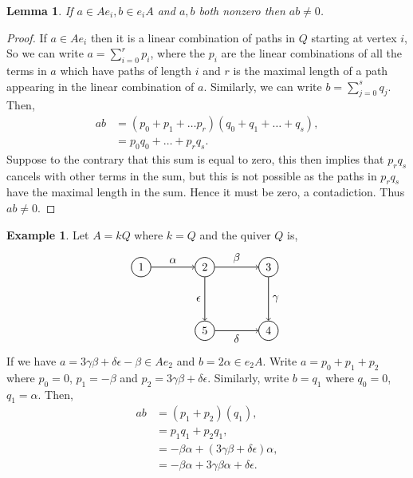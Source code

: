 \documentclass[11.5pt, twoside, a4paper, titlepage]{report}
\theoremstyle{definition}
\newtheorem{eg}[mydef]{Example}
\theoremstyle{plain}
\newtheorem{lem}[mydef]{Lemma}
\begin{document}
\begin{lem} \label{idempotent0lem}
If $a \in Ae_i, b\in e_iA$ and $a,b$ both nonzero then $ab\neq 0$.
\end{lem}
\begin{proof}
If $a\in Ae_i$ then it is a linear combination of paths in $Q$ starting at vertex $i$, So we can write $a= \sum^r_{i=0}p_i$, where the $p_i$ are the linear combinations of all the terms in $a$ which have paths of length $i$ and $r$ is the maximal length of a path appearing in the linear combination of $a$. Similarly, we can write $b=\sum^s_{j=0}q_j$. Then,
\begin{align*}
ab&=(p_0 +p_1+ \dots p_r)(q_0+q_1+\dots+q_s),\\
&=p_0q_0+ \dots + p_rq_s.
\end{align*}
Suppose to the contrary that this sum is equal to zero, this then implies that $p_rq_s$ cancels with other terms in the sum, but this is not possible as the paths in $p_rq_s$ have the maximal length in the sum. Hence it must be zero, a contadiction. Thus $ab\neq0$.
\end{proof}

\begin{eg}
Let $A=kQ$ where $k= Q$ and the quiver $Q$ is,
\begin{equation*}
\begin{tikzpicture}[->,-latex, auto, every path/.style={->, semithick}, main node/.style={draw, circle}]
\node	[main node]		(1) at (0,0)		{1};
\node [main node]		(2) at (2,0)		{2};
\node [main node]		(3) at (4,0)		{3};
\node [main node]		(4) at (4,-2)		{4};
\node [main node]		(5) at (2,-2)		{5};

\draw (1) edge node [auto] {$\alpha$} (2);
\draw (2) edge node [auto] {$\beta$} (3);
\draw (3) edge node [auto] {$\gamma$} (4);
\draw (5) edge node [auto, swap] {$\delta$} (4);
\draw (2) edge node [auto, swap] {$\epsilon$} (5);
\end{tikzpicture}
\end{equation*}
If we have $a=3\gamma\beta +\delta\epsilon-\beta \in Ae_2$ and $b=2\alpha \in e_2A$. Write $a=p_0+p_1+p_2$ where $p_0=0$, $p_1=-\beta$ and $p_2=3\gamma\beta+\delta\epsilon$. Similarly, write $b=q_1$ where $q_0=0$, $q_1=\alpha$. Then,
\begin{align*}
ab&=(p_1+p_2)(q_1),\\
&=p_1q_1+p_2q_1,\\
&=-\beta\alpha + (3\gamma\beta+\delta\epsilon)\alpha,\\
&=-\beta\alpha+3\gamma\beta\alpha+\delta\epsilon.
\end{align*}
\end{eg}
\end{document}
